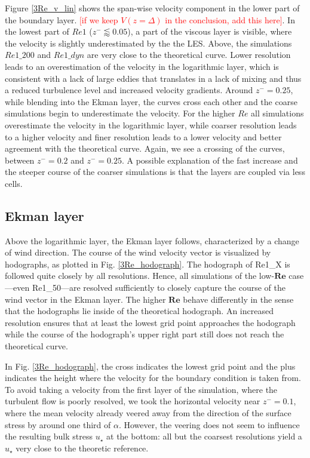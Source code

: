 \documentclass[a4paper,11pt]{article}
\newcommand{\todo}[1]{\textcolor{red}{$[$#1$]$}}
\newcommand{\RE}{\mathbf{Re}}
\begin{document}
Figure \ref{3Re_v_lin} shows the span-wise velocity component in the lower part of the boundary layer. \todo{if we keep $V(z=\Delta)$ in the conclusion, add this here}. In the lowest part of $Re1$ ($z^-\lessapprox 0.05$), a part of the viscous layer is visible, where the velocity is slightly underestimated by the the LES. Above, the simulations $Re1\_200$ and $Re1\_dyn$ are very close to the theoretical curve. Lower resolution leads to an overestimation of the velocity in the logarithmic layer, which is consistent with a lack of large eddies that translates in a lack of mixing and thus a reduced turbulence level and increased velocity gradients. Around $z^-=0.25$, while blending into the Ekman layer, the curves cross each other and the coarse simulations begin to underestimate the velocity. For the higher $Re$ all simulations overestimate the velocity in the logarithmic layer, while coarser resolution leads to a higher velocity and finer resolution leads to a lower velocity and better agreement with the theoretical curve. Again, we see a crossing of the curves, between $z^-=0.2$ and $z^-=0.25$. A possible explanation of the fast increase and the steeper course of the coarser simulations is that the layers are coupled via less cells.

\subsection{Ekman layer}

Above the logarithmic layer, the Ekman layer follows, characterized by a change of wind direction. The course of the wind velocity vector is visualized by hodographs, as plotted in Fig. \ref{3Re_hodograph}. The hodograph of Re1\_X is followed quite closely by all resolutions. Hence, all simulations of the low-$\RE$ case---even Re1\_50---are resolved sufficiently to closely capture the course of the wind vector in the Ekman layer. The higher $\RE$ behave differently in the sense that the hodographs lie inside of the theoretical hodograph. An increased resolution ensures that at least the lowest grid point approaches the hodograph while the course of the hodograph's upper right part still does not reach the theoretical curve. 

In Fig. \ref{3Re_hodograph}, the cross indicates the lowest grid point and the plus indicates the height where the velocity for the boundary condition is taken from. To avoid taking a velocity from the first layer of the simulation, where the turbulent flow is poorly resolved, we took the horizontal velocity near $z^-=0.1$, where the mean velocity already veered away from the direction of the surface stress by around one third of $\alpha$. However, the veering does not seem to influence the resulting bulk stress $u_\star$ at the bottom: all but the coarsest resolutions yield a $u_\star$ very close to the theoretic reference.
\end{document}

